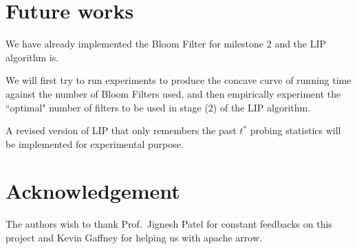 \documentclass[10pt]{article}
\begin{document}

\section{Future works}

We have already implemented the Bloom Filter for milestone 2 and the LIP algorithm is.

We will first try to run experiments to produce the concave curve of running time against the number of Bloom Filters used, and then empirically experiment the ``optimal" number of filters to be used in stage (2) of the LIP algorithm.

A revised version of LIP that only remembers the past $t^*$ probing statistics will be implemented for experimental purpose. 



\section*{Acknowledgement}
The authors wish to thank Prof.\ Jignesh Patel for constant feedbacks on this project and Kevin Gaffney for helping us with apache arrow.


{}

\end{document}
